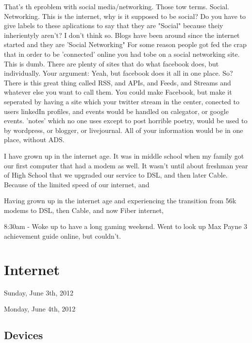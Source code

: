 \documentclass[12pt,letterpaper]{article}
\begin{document}
That's th eproblem with social media/networking. Those tow terms.
Social. Networking. This is the internet, why is it supposed to be
social? Do you have to give labels to these aplications to say that they
are "Social" because theiy inherientyly aren't? I don't think so. Blogs
have been around since the internet started and they are 'Social
Networking" For some reason people got fed the crap that in order to be
'connected' online you had tobe on a social networking site. This is
dumb. There are plenty of sites that do what facebook does, but
individually. Your argument: Yeah, but facebook does it all in one
place. So? There is this great thing called RSS, and APIs, and Feeds,
and Streams and whatever else you want to call them. You could make
Facebook, but make it seperated by having a site which your twitter
stream in the center, conected to users linkedIn profiles, and events
would be handled on calegator, or google events. 'notes' which no one
uses except to post horrible poetry, would be used to by wordpress, or
blogger, or livejournal.  All of your information would be in one place,
without ADS.













I have grown up in the internet age. It was in  middle school when my
family got our first computer that had a modem as well. It wasn't until
about freshman year of High School that we upgraded our service to DSL,
and then later Cable. Because of the limited speed of our internet, and 

Having grown up in the internet age and experiencing the transition from
56k modems to DSL, then Cable, and now Fiber internet,  


8:30am - Woke up to have a long gaming weekend. Went to look up Max
Payne 3 achievement guide online, but couldn't.







\section{Internet}
Sunday, June 3th, 2012

Monday, June 4th, 2012


\subsection{Devices}
\end{document}
